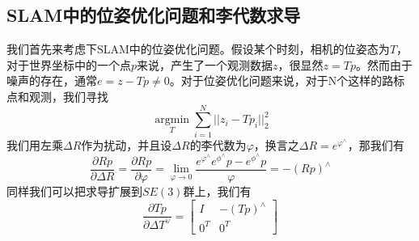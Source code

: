 \subsection{SLAM中的位姿优化问题和李代数求导}
我们首先来考虑下SLAM中的位姿优化问题。假设某个时刻，相机的位姿态为\(T\)，对于世界坐标中的一个点\(p\)来说，产生了一个观测数据\(z\)，很显然\(z=Tp\)。然而由于噪声的存在，通常\(e = z-Tp \neq 0\)。对于位姿优化问题来说，对于N个这样的路标点和观测，我们寻找
\[
    \mathop{argmin}\limits_{T} \sum_{i=1}^N ||z_i - Tp_i||^2_2
\]
我们用左乘\(\Delta R\)作为扰动，并且设\(\Delta R\)的李代数为\(\varphi\)，换言之\(\Delta R = e^{\varphi^\wedge}\)，那我们有
\[
    \frac{\partial Rp}{\partial \Delta R} = \frac{\partial Rp}{\partial \varphi} = \mathop{lim}\limits_{\varphi \rightarrow 0}\frac{e^{\varphi^\wedge} e^{\phi^\wedge} p - e^{\phi^\wedge} p}{\varphi} = -(Rp)^\wedge
\]
同样我们可以把求导扩展到\(SE(3)\)群上，我们有
\[
\frac{\partial Tp}{\partial \Delta T^\vee} = \begin{bmatrix}I & -(Tp)^\wedge \\ 0^T & 0^T\end{bmatrix}
\]